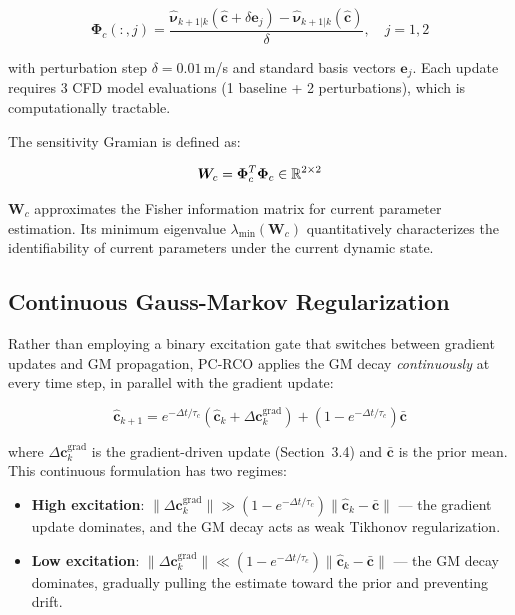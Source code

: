 \begin{equation}
    \bm{\Phi}_c(:,j) = \frac{\hat{\bm{\nu}}_{k+1|k}(\hat{\bm{c}}+\delta\bm{e}_j) - \hat{\bm{\nu}}_{k+1|k}(\hat{\bm{c}})}{\delta}, \quad j=1,2
    \label{eq:numerical_phi}
\end{equation}

with perturbation step $\delta=0.01$\,m/s and standard basis vectors $\bm{e}_j$. Each update requires 3 CFD model evaluations (1 baseline + 2 perturbations), which is computationally tractable.

The sensitivity Gramian is defined as:

\begin{equation}
    \bm{W}_c = \bm{\Phi}_c^T\bm{\Phi}_c \in \mathbb{R}^{2\times 2}
    \label{eq:gramian}
\end{equation}

$\bm{W}_c$ approximates the Fisher information matrix for current parameter estimation. Its minimum eigenvalue $\lambda_{\min}(\bm{W}_c)$ quantitatively characterizes the identifiability of current parameters under the current dynamic state.

\subsection{Continuous Gauss-Markov Regularization}

Rather than employing a binary excitation gate that switches between gradient updates and GM propagation, PC-RCO applies the GM decay \emph{continuously} at every time step, in parallel with the gradient update:

\begin{equation}
    \hat{\bm{c}}_{k+1} = e^{-\Delta t/\tau_c}\left(\hat{\bm{c}}_k + \Delta\bm{c}_k^{\text{grad}}\right) + (1-e^{-\Delta t/\tau_c})\bar{\bm{c}}
    \label{eq:continuous_gm}
\end{equation}

where $\Delta\bm{c}_k^{\text{grad}}$ is the gradient-driven update (Section~3.4) and $\bar{\bm{c}}$ is the prior mean. This continuous formulation has two regimes:
\begin{itemize}[itemsep=0pt,topsep=4pt]
    \item \textbf{High excitation}: $\|\Delta\bm{c}_k^{\text{grad}}\| \gg (1-e^{-\Delta t/\tau_c})\|\hat{\bm{c}}_k - \bar{\bm{c}}\|$ --- the gradient update dominates, and the GM decay acts as weak Tikhonov regularization.
    \item \textbf{Low excitation}: $\|\Delta\bm{c}_k^{\text{grad}}\| \ll (1-e^{-\Delta t/\tau_c})\|\hat{\bm{c}}_k - \bar{\bm{c}}\|$ --- the GM decay dominates, gradually pulling the estimate toward the prior and preventing drift.
\end{itemize}

